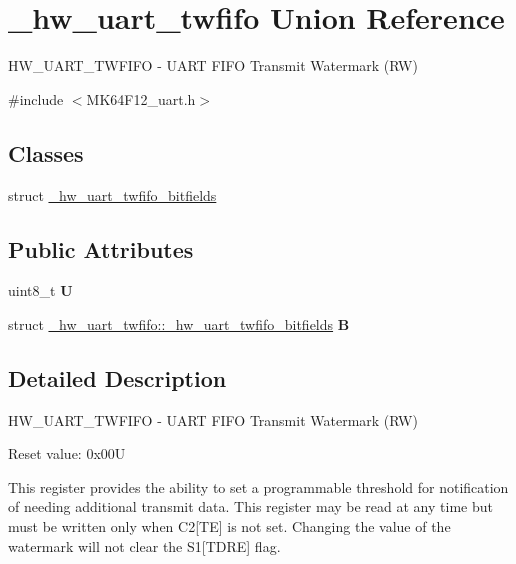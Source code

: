 \hypertarget{union__hw__uart__twfifo}{}\section{\+\_\+hw\+\_\+uart\+\_\+twfifo Union Reference}
\label{union__hw__uart__twfifo}


H\+W\+\_\+\+U\+A\+R\+T\+\_\+\+T\+W\+F\+I\+FO -\/ U\+A\+RT F\+I\+FO Transmit Watermark (RW)  




{\ttfamily \#include $<$M\+K64\+F12\+\_\+uart.\+h$>$}

\subsection*{Classes}
\begin{DoxyCompactItemize}
\item 
struct \hyperlink{struct__hw__uart__twfifo_1_1__hw__uart__twfifo__bitfields}{\+\_\+hw\+\_\+uart\+\_\+twfifo\+\_\+bitfields}
\end{DoxyCompactItemize}
\subsection*{Public Attributes}
\begin{DoxyCompactItemize}
\item 
uint8\+\_\+t {\bfseries U}\hypertarget{union__hw__uart__twfifo_a6a764d7e5a820adadb8315c184f926a7}{}\label{union__hw__uart__twfifo_a6a764d7e5a820adadb8315c184f926a7}

\item 
struct \hyperlink{struct__hw__uart__twfifo_1_1__hw__uart__twfifo__bitfields}{\+\_\+hw\+\_\+uart\+\_\+twfifo\+::\+\_\+hw\+\_\+uart\+\_\+twfifo\+\_\+bitfields} {\bfseries B}\hypertarget{union__hw__uart__twfifo_a3dc043bc3b850757a37a9e58883c8b96}{}\label{union__hw__uart__twfifo_a3dc043bc3b850757a37a9e58883c8b96}

\end{DoxyCompactItemize}


\subsection{Detailed Description}
H\+W\+\_\+\+U\+A\+R\+T\+\_\+\+T\+W\+F\+I\+FO -\/ U\+A\+RT F\+I\+FO Transmit Watermark (RW) 

Reset value\+: 0x00U

This register provides the ability to set a programmable threshold for notification of needing additional transmit data. This register may be read at any time but must be written only when C2\mbox{[}TE\mbox{]} is not set. Changing the value of the watermark will not clear the S1\mbox{[}T\+D\+RE\mbox{]} flag. 

